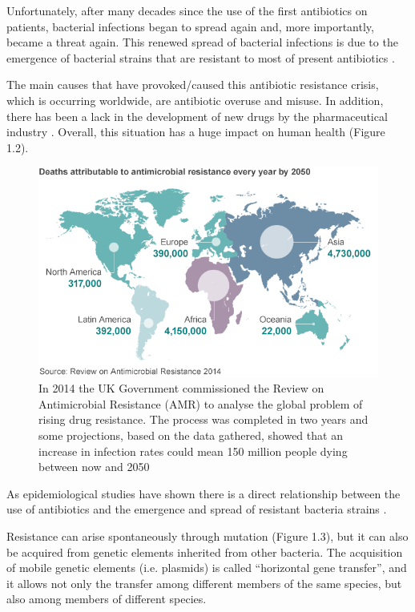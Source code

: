 \documentclass[11pt]{report}
\begin{document}
Unfortunately, after many decades since the use of the first antibiotics on patients, bacterial infections began to spread again and, more importantly, became a threat again.
This renewed spread of bacterial infections is due to the emergence of bacterial strains that are resistant to most of present antibiotics \cite{ventola2015antibiotic}.

The main causes that have provoked/caused this antibiotic resistance crisis, which is occurring worldwide, are antibiotic overuse and misuse.
In addition, there has been a lack in the development of new drugs by the pharmaceutical industry \cite{nature2013}.
Overall, this situation has a huge impact on human health (Figure 1.2).

\begin{figure}[htp]
\centering
\includegraphics[scale=0.80]{immagini gamalero/Antimicrobial_Spread2050.png}
\caption{In 2014 the UK Government commissioned the Review on Antimicrobial Resistance (AMR) to analyse the global problem of rising drug resistance. The process was completed in two years and some projections, based on the data gathered, showed that an increase in infection rates could mean 150 million people dying between now and 2050 \cite{review2014antimicrobial}}
\label{}
\end{figure}

As epidemiological studies have shown there is a direct relationship between the use of antibiotics and the emergence and spread of resistant bacteria strains \cite{huttner2013antimicrobial}.

Resistance can arise spontaneously through mutation (Figure 1.3), but it can also be acquired from genetic elements inherited from other bacteria.
The acquisition of mobile genetic elements (i.e. plasmids) is called “horizontal gene transfer”, and it allows not only the transfer among different members of the same species, but also among members of different species.
\end{document}
